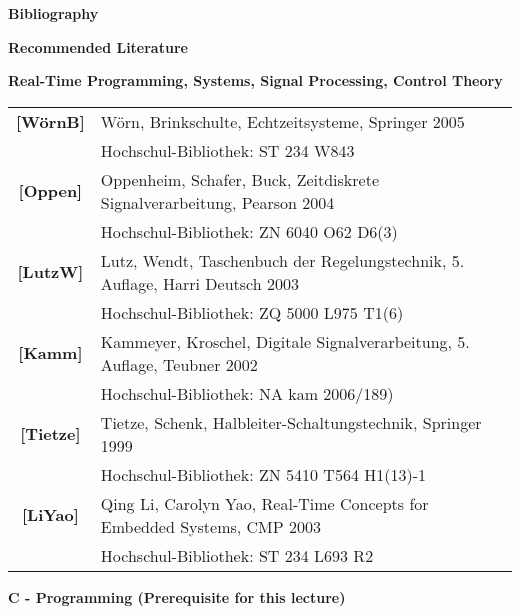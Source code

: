 \huge \textbf{Bibliography} \vspace{0.5cm}

\large \textbf{Recommended Literature}\vspace{0.5cm}

\textbf{Real-Time Programming, Systems, Signal Processing, Control Theory}

\begin{table}[h!]
\setlength{\tabcolsep}{10pt} %
\renewcommand{\arraystretch}{1.5} %
\begin{tabular}{|c|l|} \hline   
\textbf{[WörnB]}  & Wörn, Brinkschulte, Echtzeitsysteme, Springer 2005 \\ 
& Hochschul-Bibliothek: ST 234 W843 \\ \hline 

\textbf{[Oppen]}  & Oppenheim, Schafer, Buck, Zeitdiskrete Signalverarbeitung, Pearson 2004 \\ 
& Hochschul-Bibliothek: ZN 6040 O62 D6(3)\\ \hline 

 \textbf{[LutzW]}  & Lutz, Wendt, Taschenbuch der Regelungstechnik, 5. Auflage, Harri Deutsch 2003 \\ 
 & Hochschul-Bibliothek: ZQ 5000 L975 T1(6)\\ \hline 
 
\textbf{[Kamm]}  & Kammeyer, Kroschel, Digitale Signalverarbeitung, 5. Auflage, Teubner 2002 \\ 
&  Hochschul-Bibliothek: NA kam 2006/189)\\ \hline

\textbf{[Tietze]}  & Tietze, Schenk, Halbleiter-Schaltungstechnik, Springer 1999 \\ 
& Hochschul-Bibliothek: ZN 5410 T564 H1(13)-1 \\ \hline 

\textbf{[LiYao]}  & Qing Li, Carolyn Yao, Real-Time Concepts for Embedded Systems, CMP 2003 \\ 
& Hochschul-Bibliothek: ST 234 L693 R2 \\ \hline

\end{tabular}
\label{}
\end{table}

\large \textbf{C - Programming (Prerequisite for this lecture)}

